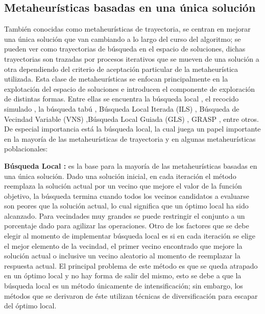 \subsection{Metaheurísticas basadas en una única solución}

También conocidas como metaheurísticas de trayectoria, se centran en mejorar una única solución que van cambiando a lo largo del curso del algoritmo; se pueden ver como trayectorias de búsqueda en el espacio de soluciones, dichas trayectorias son trazadas por procesos iterativos que se mueven de una solución a otra dependiendo del criterio de aceptación particular de la metaheurística utilizada. Esta clase de metaheurísticas se enfocan principalmente en la explotación del espacio de soluciones e introducen el componente de exploración de distintas formas. Entre ellas se encuentra la búsqueda local \cite{talbi2009metaheuristics,aarts2003local}, el recocido simulado \cite{talbi2009metaheuristics,kirkpatrick1983optimization}, la búsqueda tabú \cite{talbi2009metaheuristics,glover1989tabu}, Búsqueda Local Iterada (ILS) \cite{lourencco2003iterated}, Búsqueda de Vecindad Variable (VNS) \cite{mladenovic1997variable},Búsqueda Local Guiada (GLS) \cite{voudouris1998guided}, GRASP \cite{feo1995greedy}, entre otros. De especial importancia está la búsqueda local, la cual juega un papel importante en la mayoría de las metaheurísticas de trayectoria y en algunas metaheurísticas poblacionales:\\ 

\begin{definicion}
\textbf{Búsqueda Local \cite{talbi2009metaheuristics,aarts2003local}:}
es la base para la mayoría de las metaheurísticas basadas en una única solución. Dado una solución inicial, en cada iteración el método reemplaza la solución actual por un vecino que mejore el valor de la función objetivo, la búsqueda termina cuando todos los vecinos candidatos a evaluarse son peores que la solución actual, lo cual significa que un óptimo local ha sido alcanzado. Para vecindades muy grandes se puede restringir el conjunto a un porcentaje dado para agilizar las operaciones. Otro de los factores que se debe elegir al momento de implementar búsqueda local es si en cada iteración se elige el mejor elemento de la vecindad, el primer vecino encontrado que mejore la solución actual o inclusive un vecino aleatorio al momento de reemplazar la respuesta actual. El principal problema de este método es que se queda atrapado en un óptimo local y no hay forma de salir del mismo, esto se debe a que la búsqueda local es un método únicamente de intensificación; sin embargo, los métodos que se derivaron de éste utilizan técnicas de diversificación para escapar del óptimo local.
\end{definicion}


